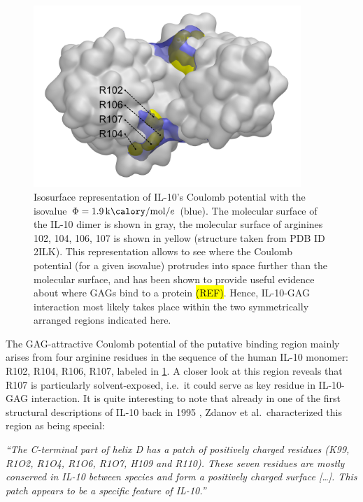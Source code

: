 \begin{figure}
\centering
\includegraphics[width=0.9\textwidth]{gfx/bspred/SI_figure_IL-10_coulomb_isosurface_1_9kcalmol.png}
\caption[]{
Isosurface representation of IL-10's Coulomb potential with the isovalue $\Phi =
\SI{1.9}{\kilo\calory\per\mole\per\elementarycharge}$ (blue). The molecular
surface of the IL-10 dimer is shown in gray, the molecular surface of arginines
102, 104, 106, 107 is shown in yellow (structure taken from PDB ID 2ILK). This
representation allows to see where the Coulomb potential (for a given isovalue)
protrudes into space further than the molecular surface, and has been shown to
provide useful evidence about where GAGs bind to a protein \hl{(REF)}. Hence,
IL-10-GAG interaction most likely takes place within the two symmetrically
arranged regions indicated here.
}
\label{fig:bspred:il10_estatic_pred}
\end{figure}

The GAG-attractive Coulomb potential of the putative binding region mainly
arises from four arginine residues in the sequence of the human IL-10 monomer:
R102, R104, R106, R107, labeled in \cref{fig:bspred:il10_estatic_pred}. A closer
look at this region reveals that R107 is particularly solvent-exposed, i.e.\ it
could serve as key residue in IL-10-GAG interaction. It is quite interesting to
note that already in one of the first structural descriptions of IL-10 back in
1995 \cite{Zdanov1995}, Zdanov et al.\ characterized this region as being
special:

\begin{adjustwidth}{1.5cm}{1.5cm}
\textit{%
\enquote{The C-terminal part of helix D has a patch of positively
charged residues (K99, R1O2, R1O4, R1O6, R1O7, H109 and R110). These seven
residues are mostly conserved in IL-10 between species and form a positively
charged surface [\dots]. This patch appears to be a specific feature of IL-10.}}
\end{adjustwidth}



